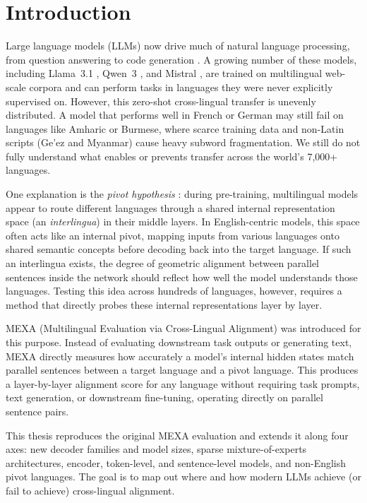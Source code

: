 \chapter{Introduction}
\label{ch:introduction}

Large language models (LLMs) now drive much of natural language processing, from question answering to code generation \citep{brown2020gpt3}. A growing number of these models, including Llama~3.1 \citep{dubey2024llama3}, Qwen~3 \citep{yang2025qwen3}, and Mistral \citep{jiang2023mistral}, are trained on multilingual web-scale corpora and can perform tasks in languages they were never explicitly supervised on. However, this zero-shot cross-lingual transfer is unevenly distributed. A model that performs well in French or German may still fail on languages like Amharic or Burmese, where scarce training data and non-Latin scripts (Ge'ez and Myanmar) cause heavy subword fragmentation. We still do not fully understand what enables or prevents transfer across the world's 7,000+ languages.

One explanation is the \emph{pivot hypothesis} \citep{wendler2024llamas}: during pre-training, multilingual models appear to route different languages through a shared internal representation space (an \emph{interlingua}) in their middle layers. In English-centric models, this space often acts like an internal pivot, mapping inputs from various languages onto shared semantic concepts before decoding back into the target language. If such an interlingua exists, the degree of geometric alignment between parallel sentences inside the network should reflect how well the model understands those languages. Testing this idea across hundreds of languages, however, requires a method that directly probes these internal representations layer by layer.

MEXA (Multilingual Evaluation via Cross-Lingual Alignment) \citep{kargaran2025mexa} was introduced for this purpose. Instead of evaluating downstream task outputs or generating text, MEXA directly measures how accurately a model's internal hidden states match parallel sentences between a target language and a pivot language. This produces a layer-by-layer alignment score for any language without requiring task prompts, text generation, or downstream fine-tuning, operating directly on parallel sentence pairs.

This thesis reproduces the original MEXA evaluation and extends it along four axes: new decoder families and model sizes, sparse mixture-of-experts architectures, encoder, token-level, and sentence-level models, and non-English pivot languages. The goal is to map out where and how modern LLMs achieve (or fail to achieve) cross-lingual alignment.


